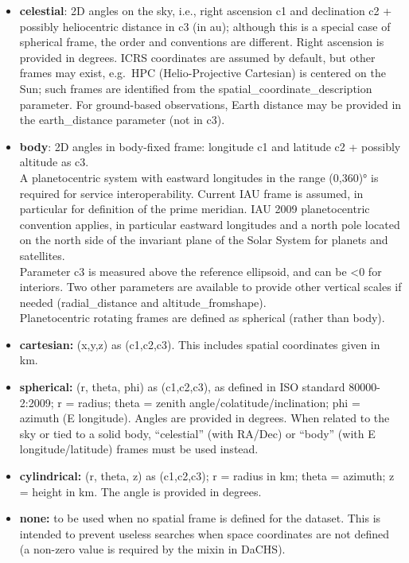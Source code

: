 \documentclass[11pt,a4paper]{ivoa}
\begin{document}
\begin{itemize}
\item \textbf{celestial}: 2D angles on the sky, i.e., right ascension
c1 and declination c2 + possibly heliocentric distance in c3 (in au);
although this is a special case of spherical frame, the order and
conventions are different. Right ascension is provided in degrees. ICRS
coordinates are assumed by default, but other frames may exist, e.g.\ HPC
(Helio-Projective Cartesian) is centered on the Sun; such frames are
identified from the spatial\_coordinate\_description parameter.
For ground-based observations, Earth distance may be provided in the
earth\_distance parameter (not in c3).

\item \textbf{body}: 2D angles in body-fixed frame: longitude c1 and
latitude c2 + possibly altitude as c3. \\A planetocentric system with
eastward longitudes in the range (0,360)° is required for service
interoperability. Current IAU frame is assumed, in particular for
definition of the prime meridian. IAU 2009 planetocentric convention
applies, in particular eastward longitudes and a north pole located on
the north side of the invariant plane of the Solar System for planets
and satellites.  \\Parameter c3 is measured above the reference
ellipsoid, and can be <0 for interiors. Two other parameters are
available to provide other vertical scales if needed (radial\_distance
and altitude\_fromshape). \\Planetocentric rotating frames are defined
as spherical (rather than body).

\item \textbf{cartesian:} (x,y,z) as (c1,c2,c3).
This includes spatial coordinates given in km.

\item \textbf{spherical:} (r, theta, phi) as (c1,c2,c3), as
defined in ISO standard 80000-2:2009; r = radius; theta = zenith
angle/colatitude/inclination; phi = azimuth (E longitude). Angles are
provided in degrees. When related to the sky or tied to a solid body,
``celestial'' (with RA/Dec) or ``body'' (with E longitude/latitude)
frames must be used instead.

\item \textbf{cylindrical:} (r, theta, z) as (c1,c2,c3); r = radius in
km; theta = azimuth; z = height in km. The angle is provided in degrees.

\item \textbf{none:} to be used when no spatial frame is defined for
the dataset. This is intended to prevent useless searches when space
coordinates are not defined (a non-zero value is required by the mixin
in DaCHS).

\end{itemize}
\end{document}
